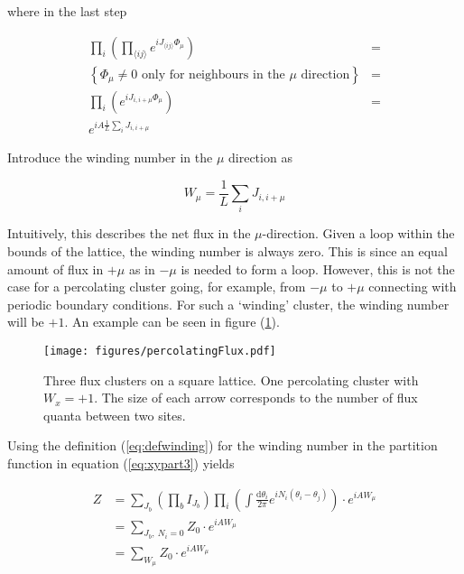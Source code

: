 where in the last step

\begin{align}
    \prod_i \left (\prod_{\langle ij \rangle} e^{i J_{\langle ij \rangle} \Phi_\mu} \right) &= \\
%
    \left\{ \text{$\Phi_\mu \neq 0$ only for neighbours in the $\mu$ direction} \right \} &= \\
%
    \prod_i \left ( e^{iJ_{i, i+\mu} \Phi_\mu} \right ) &= \\
%
    e^{iA \frac{1}{L} \sum_i J_{i, i+\mu}}
\end{align}

Introduce the winding number in the $\mu$ direction as

\begin{equation}
    W_\mu = \frac{1}{L} \sum_i J_{i, i+\mu}
\label{eq:defwinding}
\end{equation}

Intuitively, this describes the net flux in the $\mu$-direction. Given a loop within the bounds of the lattice, the winding number is always zero. This is since an equal amount of flux in $+\mu$ as in $-\mu$ is needed to form a loop. However, this is not the case for a percolating cluster going, for example, from $-\mu$ to $+\mu$ connecting with periodic boundary conditions. For such a `winding' cluster, the winding number will be $+1$. An example can be seen in figure (\ref{fig:fluxpercolation}).

\begin{figure}[h!]
    \centering
        \texttt{[image: figures/percolatingFlux.pdf]}
    \caption{Three flux clusters on a square lattice. One percolating cluster with $W_x = +1$. The size of each arrow corresponds to the number of flux quanta between two sites.}
    \label{fig:fluxpercolation}
\end{figure}

Using the definition (\ref{eq:defwinding}) for the winding number in the partition function in equation (\ref{eq:xypart3}) yields

\begin{align}
    Z &= \sum_{J_b} \left ( \prod_b I_{J_b} \right ) \prod_i \left ( \int \frac{\mathrm d \theta_i}{2 \pi} e^{i N_i (\theta_i - \theta_j)} \right ) \cdot e^{i A W_\mu} \\
    &= \sum_{J_b, \ N_i = 0} Z_0 \cdot e^{i A W_\mu} \\
    &= \sum_{W_\mu} Z_0 \cdot e^{i A W_\mu}
\end{align}

